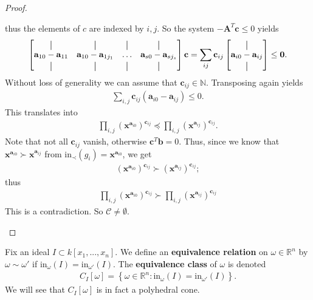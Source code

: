 \documentclass[a4paper, 11pt]{article}
\newcommand*{\vertbar}{\rule[-1ex]{0.5pt}{2.5ex}}
\begin{document}
\begin{proof}
\begin{itemize}
    thus the elements of \( c \) are indexed by \( i,j \). So the system \( -\mathbf A^T \mathbf c \leq 0 \) yields
    \begin{align*}
      \begin{bmatrix}
        \vertbar & \vertbar & \vertbar & \vertbar \\
        \mathbf a_{10} - \mathbf a_{11} & \mathbf a_{10} - \mathbf a_{1j_1} & \dots & \mathbf a_{s0} - \mathbf a_{sj_s}\\
        \vertbar & \vertbar & \vertbar & \vertbar
      \end{bmatrix} \mathbf c = \sum_{ij} \mathbf c_{ij} \begin{bmatrix}
        \vertbar\\
        \mathbf a_{i0} - \mathbf a_{ij}\\
        \vertbar
      \end{bmatrix} \leq \mathbf 0.
    \end{align*}
    Without loss of generality we can assume that \( \mathbf c_{ij} \in \mathbb N \). Transposing again yields
    \begin{align*}
      \sum_{i,j} \mathbf c_{ij} (\mathbf a_{i0} - \mathbf a_{ij}) \leq 0.
    \end{align*}
    This translates into 
    \begin{align*}
      \prod_{i,j} (\mathbf x^{\mathbf a_{i0}})^{\mathbf c_{ij}} \preceq \prod_{i,j} (\mathbf x^{\mathbf a_{ij}})^{\mathbf c_{ij}}.
    \end{align*}
    Note that not all \( \mathbf c_{ij} \)  vanish, otherwise \( \mathbf c^T \mathbf b = 0 \). Thus, since we know that \( \mathbf x^{\mathbf a_{i0}} \succ \mathbf x^{\mathbf a_{ij}} \) from \( \mathrm{in}_\prec (g_i) = \mathbf x^{\mathbf a_{i0}}\), we get 
    \begin{align*}
      (\mathbf x^{\mathbf a_{i0}})^{\mathbf c_{ij}} \succ (\mathbf x^{\mathbf a_{ij}})^{\mathbf c_{ij}};
    \end{align*}
    thus 
    \begin{align*}
      \prod_{i,j} (\mathbf x^{\mathbf a_{i0}})^{\mathbf c_{ij}} \succ \prod_{i,j} (\mathbf x^{\mathbf a_{ij}})^{\mathbf c_{ij}}
    \end{align*}
    This is a contradiction. So \( \mathcal{C} \neq \emptyset \).
  \end{itemize}
\end{proof}

Fix an ideal \( I \subset k[x_1,...,x_n] \). We define an \textbf{equivalence relation} on \( \omega \in \mathbb R^n \) by \( \omega \sim \omega' \) if \( \mathrm{in}_{\omega}(I) = \mathrm{in}_{\omega'}(I) \). The \textbf{equivalence class} of \( \omega \) is denoted 
\begin{align*}
  C_I[\omega] = \left\{ \omega \in \mathbb R^n : \mathrm{in}_{\omega}(I) = \mathrm{in}_{\omega '}(I) \right\}.
\end{align*}
We will see that \( C_I[\omega] \) is in fact a polyhedral cone.
\end{document}
